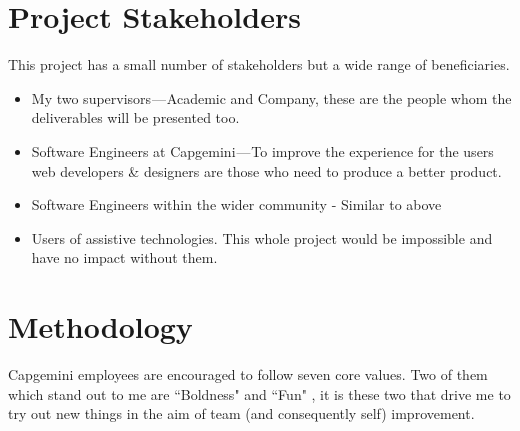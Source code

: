 \section{Project Stakeholders}
This project has a small number of stakeholders but a wide range of beneficiaries.
\begin{itemize}
  \item My two supervisors — Academic and Company, these are the people whom
  the deliverables will be presented too.
  \item Software Engineers at Capgemini — To improve the experience for the
  users web developers \& designers are those who need to produce a better
  product.
  \item Software Engineers within the wider community - Similar to above
  \item Users of assistive technologies. This whole project would be
    impossible and have no impact without them.
\end{itemize}

\section{Methodology}
Capgemini employees are encouraged to follow seven core values. Two of them
which stand out to me are ``Boldness" and ``Fun" \citep{CapValues}, it is these
two that drive me to try out new things in the aim of team (and consequently
self) improvement.

